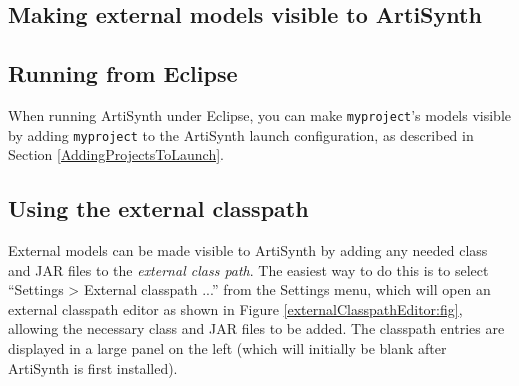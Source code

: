 \subsection{Making external models visible to ArtiSynth}
\label{MakingExternalModelsVisible}

\subsection{Running from Eclipse}

When running ArtiSynth under Eclipse, you can make {\tt myproject}'s
models visible by adding {\tt myproject} to the ArtiSynth launch
configuration, as described in Section
\ref{AddingProjectsToLaunch}. 

\subsection{Using the external classpath}
\label{ExternalClasspath:sec}

External models can be made visible to ArtiSynth by adding any needed
class \directories{} and JAR files to the {\it external class path}.
The easiest way to do this is to select ``{\sf Settings > External
classpath ...}'' from the {\sf Settings} menu, which will open an
external classpath editor as shown in
Figure \ref{externalClasspathEditor:fig}, allowing the necessary
class \directories{} and JAR files to be added.  The classpath entries
are displayed in a large panel on the left (which will initially be
blank after ArtiSynth is first installed).  

